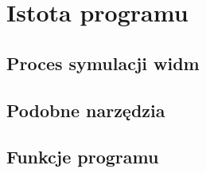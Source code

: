 \section{Istota programu}\label{tesliper:essence}
\subsection{Proces symulacji widm}\label{essence:simulation}
\subsection{Podobne narzędzia}\label{essence:simmilar}
\subsection{Funkcje programu}\label{essence:features}
